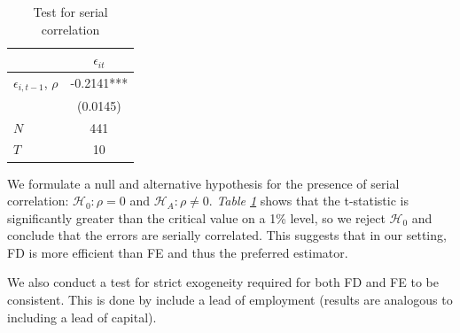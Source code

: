 \documentclass[11pt]{article}
\begin{document}
\begin{table}[H]
    \centering
    \caption{Test for serial correlation}
    \label{tab:Serial_corr}
    \begin{threeparttable}
        \begin{tabular}{lc}
        \toprule
                     & $\epsilon_{it}$ \\
        \midrule
        $\epsilon_{i,t-1}$, $\rho$    &         -0.2141*** \\
                     &           (0.0145) \\
        \midrule
        $N$          & 441  \\
        $T$          & 10 \\
        \bottomrule
        \end{tabular}
    \end{threeparttable}
\end{table}

We formulate a null and alternative hypothesis for the presence of serial correlation: $\mathcal{H}_0:\rho=0$ and $\mathcal{H}_A:\rho\ne0$. 
\textit{Table \ref{tab:Serial_corr}} shows that the t-statistic is significantly greater than the critical value on a 1\% level, so we reject $\mathcal{H}_0$ and conclude that the errors are serially correlated. This suggests that in our setting, FD is more efficient than FE and thus the preferred estimator. 

We also conduct a test for strict exogeneity required for both FD and FE to be consistent. This is done by include a lead of employment (results are analogous to including a lead of capital). 
\end{document}
